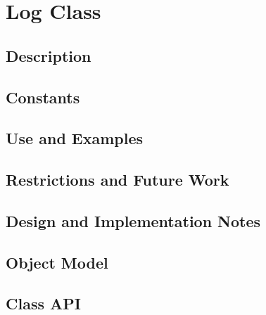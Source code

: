 \documentclass[english]{article}
\begin{document}
\section{Log Class}
\label{log_class}
\subsection{Description}

\subsection{Constants}

\subsection{Use and Examples}


\subsection{Restrictions and Future Work}

\subsection{Design and Implementation Notes}

\subsection{Object Model}

\subsection{Class API}

%
%
%
%
\end{document}
